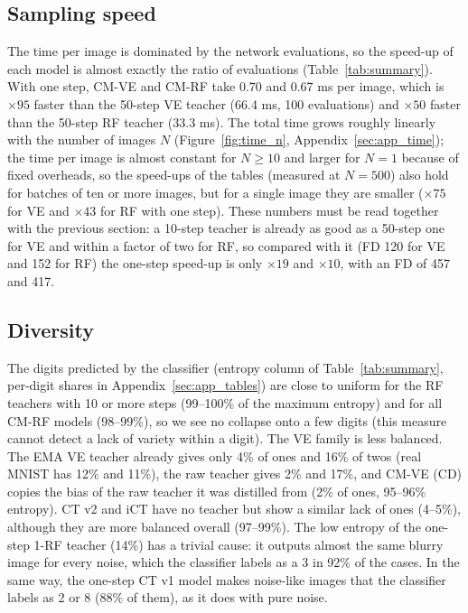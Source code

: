 \documentclass{article}
\begin{document}
\subsection{Sampling speed}

The time per image is dominated by the network evaluations, so the speed-up of
each model is almost exactly the ratio of evaluations (Table~\ref{tab:summary}).
With one step, CM-VE and CM-RF take 0.70 and 0.67 ms per image, which is
$\times 95$ faster than the 50-step VE teacher (66.4 ms, 100 evaluations) and
$\times 50$ faster than the 50-step RF teacher (33.3 ms). The total time grows
roughly linearly with the number of images $N$ (Figure~\ref{fig:time_n},
Appendix~\ref{sec:app_time}); the time per image is almost constant for
$N \geq 10$ and larger for $N = 1$ because of fixed overheads, so the speed-ups
of the tables (measured at $N = 500$) also hold for batches of ten or more
images, but for a single image they are smaller ($\times 75$ for VE and
$\times 43$ for RF with one step). These numbers must be read together with the
previous section: a 10-step teacher is already as good as a 50-step one for VE
and within a factor of two for RF, so compared with it (FD 120 for VE and 152 for RF) the one-step speed-up is only
$\times 19$ and $\times 10$, with an FD of 457 and 417.

\subsection{Diversity}

The digits predicted by the classifier (entropy column of
Table~\ref{tab:summary}, per-digit shares in Appendix~\ref{sec:app_tables}) are
close to uniform for the RF teachers with 10 or more steps (99--100\% of the
maximum entropy) and for all CM-RF models (98--99\%), so we see no collapse
onto a few digits (this measure cannot detect a lack of variety within a digit). The VE family is less balanced. The EMA VE teacher already gives only
4\% of ones and 16\% of twos (real MNIST has 12\% and 11\%), the raw teacher
gives 2\% and 17\%, and CM-VE (CD) copies the bias of the raw teacher it was
distilled from (2\% of ones, 95--96\% entropy). CT v2 and iCT have no teacher but
show a similar lack of ones (4--5\%), although they are more balanced overall
(97--99\%). The low entropy of the one-step 1-RF teacher (14\%) has a trivial cause: it
outputs almost the same blurry image for every noise, which the classifier
labels as a 3 in 92\% of the cases. In the same way, the one-step CT v1 model makes noise-like images that
the classifier labels as 2 or 8 (88\% of them), as it does with pure noise.
\end{document}
